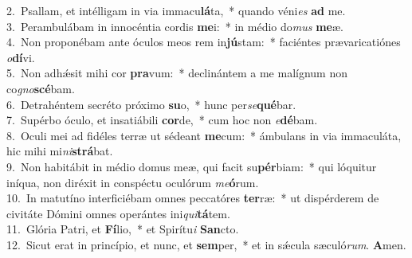 {2.~}Psallam, et intélligam in via immacu\textbf{lá}ta,~* quando véni\textit{es} \textbf{ad} me.\\
{3.~}Perambulábam in innocéntia cordis \textbf{me}i:~* in médio do\textit{mus} \textbf{me}æ.\\
{4.~}Non proponébam ante óculos meos rem in\textbf{jú}stam:~* faciéntes prævaricatiónes \textit{o}\textbf{dí}vi.\\
{5.~}Non adhǽsit mihi cor \textbf{pra}vum:~* declinántem a me malígnum non co\textit{gno}\textbf{scé}bam.\\
{6.~}Detrahéntem secréto próximo \textbf{su}o,~* hunc per\textit{se}\textbf{qué}bar.\\
{7.~}Supérbo óculo, et insatiábili \textbf{cor}de,~* cum hoc non \textit{e}\textbf{dé}bam.\\
{8.~}Oculi mei ad fidéles terræ ut sédeant \textbf{me}cum:~* ámbulans in via immaculáta, hic mihi mi\textit{ni}\textbf{strá}bat.\\
{9.~}Non habitábit in médio domus meæ, qui facit su\textbf{pér}biam:~* qui lóquitur iníqua, non diréxit in conspéctu oculórum \textit{me}\textbf{ó}rum.\\
{10.~}In matutíno interficiébam omnes peccatóres \textbf{ter}ræ:~* ut dispérderem de civitáte Dómini omnes operántes ini\textit{qui}\textbf{tá}tem.\\
{11.~}Glória Patri, et \textbf{Fí}lio,~* et Spirítu\textit{i} \textbf{San}cto.\\
{12.~}Sicut erat in princípio, et nunc, et \textbf{sem}per,~* et in sǽcula sæculó\textit{rum}. \textbf{A}men.\\
